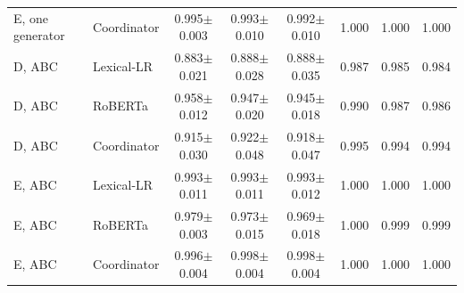 \begin{table}[t]
\begin{tabular}{llcccccc}
E, one generator & Coordinator & 0.995$\pm$0.003 & 0.993$\pm$0.010 & 0.992$\pm$0.010 & 1.000 & 1.000 & 1.000 \\
D, ABC & Lexical-LR & 0.883$\pm$0.021 & 0.888$\pm$0.028 & 0.888$\pm$0.035 & 0.987 & 0.985 & 0.984 \\
D, ABC & RoBERTa & 0.958$\pm$0.012 & 0.947$\pm$0.020 & 0.945$\pm$0.018 & 0.990 & 0.987 & 0.986 \\
D, ABC & Coordinator & 0.915$\pm$0.030 & 0.922$\pm$0.048 & 0.918$\pm$0.047 & 0.995 & 0.994 & 0.994 \\
E, ABC & Lexical-LR & 0.993$\pm$0.011 & 0.993$\pm$0.011 & 0.993$\pm$0.012 & 1.000 & 1.000 & 1.000 \\
E, ABC & RoBERTa & 0.979$\pm$0.003 & 0.973$\pm$0.015 & 0.969$\pm$0.018 & 1.000 & 0.999 & 0.999 \\
E, ABC & Coordinator & 0.996$\pm$0.004 & 0.998$\pm$0.004 & 0.998$\pm$0.004 & 1.000 & 1.000 & 1.000 \\
\bottomrule
\end{tabular}
\end{table}
